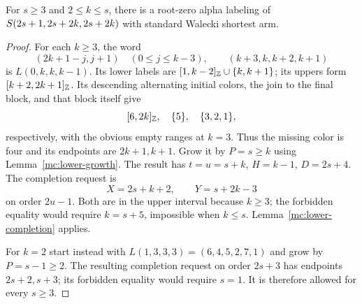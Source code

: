 \begin{lemma}\label{mc:oee-repeated-central}
For $s\ge3$ and $2\le k\le s$, there is a root-zero alpha
labeling of $S\!\left(2s+1,2s+2k,2s+2k\right)$ with standard Walecki
shortest arm.
\end{lemma}
\begin{proof}
For each $k\ge3$, the word
\[
 (2k+1-j,j+1)\quad(0\le j\le k-3),
 \qquad (k+3,k,k+2,k+1)
\]
is $L(0,k,k,k-1)$.  Its lower labels are
$[1,k-2]_{\mathbb Z}\cup\{k,k+1\}$; its uppers form
$[k+2,2k+1]_{\mathbb Z}$.  Its descending alternating initial
colors, the join to the final block, and that block itself give
\[
 [6,2k]_{\mathbb Z},\quad\{5\},\quad\{3,2,1\},
\]
respectively, with the obvious empty ranges at $k=3$.
Thus the missing color is four and its endpoints are $2k+1,k+1$.
Grow it by $P=s\ge k$ using Lemma~\ref{mc:lower-growth}.
The result has $t=u=s+k$, $H=k-1$, $D=2s+4$.
The completion request is
\[
 X=2s+k+2,\qquad Y=s+2k-3
\]
on order $2u-1$.  Both are in the upper interval because $k\ge3$;
the forbidden equality would require $k=s+5$, impossible when
$k\le s$.  Lemma~\ref{mc:lower-completion} applies.

For $k=2$ start instead with
$L(1,3,3,3)=(6,4,5,2,7,1)$ and grow by
$P=s-1\ge2$.  The resulting completion request on order
$2s+3$ has endpoints $2s+2,s+3$; its forbidden equality would
require $s=1$.  It is therefore allowed for every $s\ge3$.
\end{proof}

